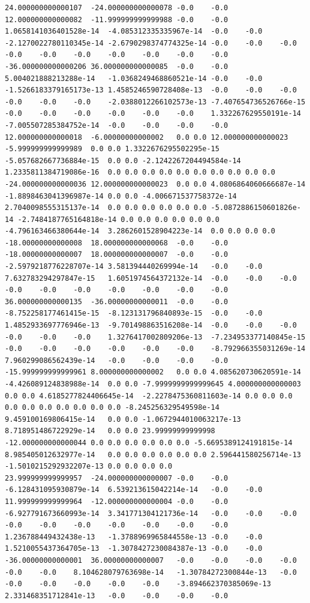 \documentclass[12pt]{report} %
\begin{document}
\begin{landscape}
\begin{lstlisting}[numbers=none, basicstyle=\ttfamily\tiny, captionpos=b, caption={Matriz de coeficientes $W = G^{-1}$ ($54\times54$) calculada con Julia, sin redondear.}, label=cod:W-julia]
24.000000000000107	-24.000000000000078	-0.0	-0.0	12.000000000000082	-11.999999999999988	-0.0	-0.0	1.0658141036401528e-14	-4.085312335335967e-14	-0.0	-0.0	-2.1270022780110345e-14	-2.6790298374774325e-14	-0.0	-0.0	-0.0	-0.0	-0.0	-0.0	-0.0	-0.0	-0.0	-0.0	-36.000000000000206	36.000000000000085	-0.0	-0.0	5.004021888213288e-14	-1.0368249468860521e-14	-0.0	-0.0	-1.5266183379165173e-13	1.4585246590728408e-13	-0.0	-0.0	-0.0	-0.0	-0.0	-0.0	-2.0388012266102573e-13	-7.407654736526766e-15	-0.0	-0.0	-0.0	-0.0	-0.0	-0.0	1.332267629550191e-14	-7.005507285384752e-14	-0.0	-0.0	-0.0	-0.0
12.000000000000018	-6.00000000000002	0.0	0.0	12.000000000000023	-5.999999999999989	0.0	0.0	1.3322676295502295e-15	-5.057682667736884e-15	0.0	0.0	-2.1242267204494584e-14	1.2335811384719086e-16	0.0	0.0	0.0	0.0	0.0	0.0	0.0	0.0	0.0	0.0	-24.000000000000036	12.000000000000023	0.0	0.0	4.0806864060666687e-14	-1.8898463041396987e-14	0.0	0.0	-4.006671537758372e-14	2.7040098555315137e-14	0.0	0.0	0.0	0.0	0.0	0.0	-5.0872886150601826e-14	-2.7484187765164818e-14	0.0	0.0	0.0	0.0	0.0	0.0	-4.796163466380644e-14	3.2862601528904223e-14	0.0	0.0	0.0	0.0
-18.00000000000008	18.000000000000068	-0.0	-0.0	-18.00000000000007	18.000000000000007	-0.0	-0.0	-2.5979218776228707e-14	3.581394440269994e-14	-0.0	-0.0	7.632783294297847e-15	1.6051974564372132e-14	-0.0	-0.0	-0.0	-0.0	-0.0	-0.0	-0.0	-0.0	-0.0	-0.0	36.000000000000135	-36.00000000000011	-0.0	-0.0	-8.752258177461415e-15	-8.123131796840893e-15	-0.0	-0.0	1.4852933697776946e-13	-9.701498863516208e-14	-0.0	-0.0	-0.0	-0.0	-0.0	-0.0	1.3276417002809206e-13	-7.234953377140845e-15	-0.0	-0.0	-0.0	-0.0	-0.0	-0.0	-8.792966355031269e-14	7.960299086562439e-14	-0.0	-0.0	-0.0	-0.0
-15.999999999999961	8.000000000000002	0.0	0.0	4.085620730620591e-14	-4.426089124838988e-14	0.0	0.0	-7.9999999999999645	4.000000000000003	0.0	0.0	4.6185277824406645e-14	-2.2278475360811603e-14	0.0	0.0	0.0	0.0	0.0	0.0	0.0	0.0	0.0	0.0	-8.245256329549598e-14	9.459100169806415e-14	0.0	0.0	-1.0672944010063217e-13	8.718951486722929e-14	0.0	0.0	23.99999999999998	-12.000000000000044	0.0	0.0	0.0	0.0	0.0	0.0	-5.6695389124191815e-14	8.985405012632977e-14	0.0	0.0	0.0	0.0	0.0	0.0	2.596441580256714e-13	-1.5010215292932207e-13	0.0	0.0	0.0	0.0
23.999999999999957	-24.000000000000007	-0.0	-0.0	-6.128431095930879e-14	6.539213615042214e-14	-0.0	-0.0	11.999999999999964	-12.000000000000004	-0.0	-0.0	-6.927791673660993e-14	3.341771304121736e-14	-0.0	-0.0	-0.0	-0.0	-0.0	-0.0	-0.0	-0.0	-0.0	-0.0	1.236788449432438e-13	-1.3788969965844558e-13	-0.0	-0.0	1.5210055437364705e-13	-1.3078427230084387e-13	-0.0	-0.0	-36.00000000000001	36.00000000000007	-0.0	-0.0	-0.0	-0.0	-0.0	-0.0	8.104628079763698e-14	-1.30784272300844e-13	-0.0	-0.0	-0.0	-0.0	-0.0	-0.0	-3.894662370385069e-13	2.331468351712841e-13	-0.0	-0.0	-0.0	-0.0

\end{lstlisting}
\end{landscape}
\end{document}
